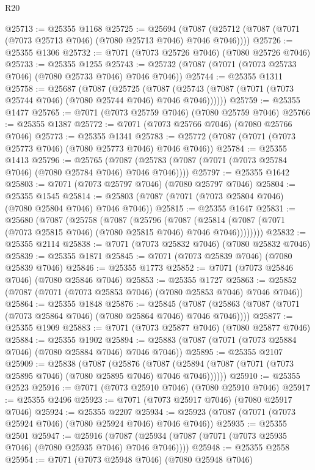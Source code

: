 \begin{lexlean}{R20}
\begin{coremodule}
{@25713 := @25355 @1168
@25725 := @25694
    (@7087 (@25712 (@7087 (@7071 (@7073 @25713 @7046) (@7080 @25713 @7046) @7046 @7046))))
@25726 := @25355 @1306
@25732 := @7071 (@7073 @25726 @7046) (@7080 @25726 @7046)
@25733 := @25355 @1255
@25743 := @25732 (@7087 (@7071 (@7073 @25733 @7046) (@7080 @25733 @7046) @7046 @7046))
@25744 := @25355 @1311
@25758 := @25687
    (@7087
      (@25725
        (@7087 (@25743 (@7087 (@7071 (@7073 @25744 @7046) (@7080 @25744 @7046) @7046 @7046))))))
@25759 := @25355 @1477
@25765 := @7071 (@7073 @25759 @7046) (@7080 @25759 @7046)
@25766 := @25355 @1387
@25772 := @7071 (@7073 @25766 @7046) (@7080 @25766 @7046)
@25773 := @25355 @1341
@25783 := @25772 (@7087 (@7071 (@7073 @25773 @7046) (@7080 @25773 @7046) @7046 @7046))
@25784 := @25355 @1413
@25796 := @25765
    (@7087 (@25783 (@7087 (@7071 (@7073 @25784 @7046) (@7080 @25784 @7046) @7046 @7046))))
@25797 := @25355 @1642
@25803 := @7071 (@7073 @25797 @7046) (@7080 @25797 @7046)
@25804 := @25355 @1545
@25814 := @25803 (@7087 (@7071 (@7073 @25804 @7046) (@7080 @25804 @7046) @7046 @7046))
@25815 := @25355 @1647
@25831 := @25680
    (@7087
      (@25758
        (@7087
          (@25796
            (@7087
              (@25814 (@7087 (@7071 (@7073 @25815 @7046) (@7080 @25815 @7046) @7046 @7046))))))))
@25832 := @25355 @2114
@25838 := @7071 (@7073 @25832 @7046) (@7080 @25832 @7046)
@25839 := @25355 @1871
@25845 := @7071 (@7073 @25839 @7046) (@7080 @25839 @7046)
@25846 := @25355 @1773
@25852 := @7071 (@7073 @25846 @7046) (@7080 @25846 @7046)
@25853 := @25355 @1727
@25863 := @25852 (@7087 (@7071 (@7073 @25853 @7046) (@7080 @25853 @7046) @7046 @7046))
@25864 := @25355 @1848
@25876 := @25845
    (@7087 (@25863 (@7087 (@7071 (@7073 @25864 @7046) (@7080 @25864 @7046) @7046 @7046))))
@25877 := @25355 @1909
@25883 := @7071 (@7073 @25877 @7046) (@7080 @25877 @7046)
@25884 := @25355 @1902
@25894 := @25883 (@7087 (@7071 (@7073 @25884 @7046) (@7080 @25884 @7046) @7046 @7046))
@25895 := @25355 @2107
@25909 := @25838
    (@7087
      (@25876
        (@7087 (@25894 (@7087 (@7071 (@7073 @25895 @7046) (@7080 @25895 @7046) @7046 @7046))))))
@25910 := @25355 @2523
@25916 := @7071 (@7073 @25910 @7046) (@7080 @25910 @7046)
@25917 := @25355 @2496
@25923 := @7071 (@7073 @25917 @7046) (@7080 @25917 @7046)
@25924 := @25355 @2207
@25934 := @25923 (@7087 (@7071 (@7073 @25924 @7046) (@7080 @25924 @7046) @7046 @7046))
@25935 := @25355 @2501
@25947 := @25916
    (@7087 (@25934 (@7087 (@7071 (@7073 @25935 @7046) (@7080 @25935 @7046) @7046 @7046))))
@25948 := @25355 @2558
@25954 := @7071 (@7073 @25948 @7046) (@7080 @25948 @7046)
}
\end{coremodule}
\end{lexlean}
